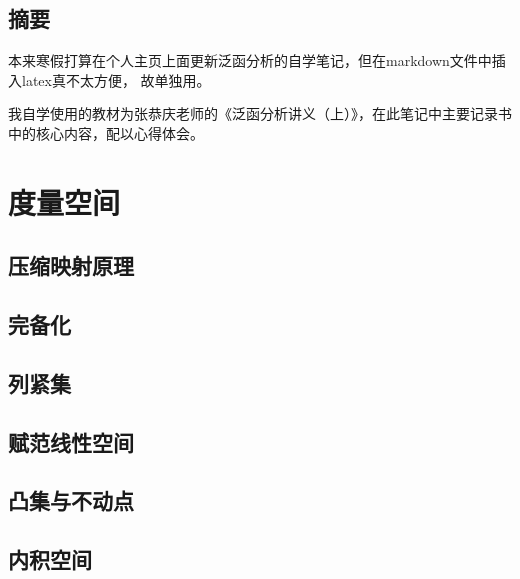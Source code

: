 \documentclass[12pt,a4paper]{article}
\begin{document}
\begin{center}
\section*{摘要}
\end{center}

本来寒假打算在个人主页上面更新泛函分析的自学笔记，但在markdown文件中插入latex真不太方便，
故单独用。

我自学使用的教材为张恭庆老师的《泛函分析讲义（上）》，在此笔记中主要记录书中的核心内容，配以心得体会。


{\centering\tableofcontents}

\newpage
\section{度量空间}
\subsection{压缩映射原理}
\subsection{完备化}
\subsection{列紧集}
\subsection{赋范线性空间}
\subsection{凸集与不动点}
\subsection{内积空间}
\end{document}
